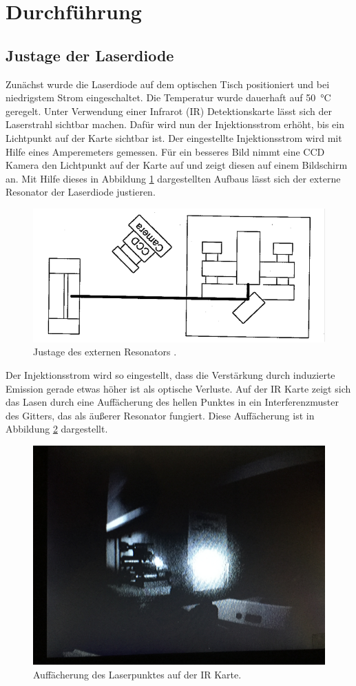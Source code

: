 \newpage
\section{Durchführung}
\label{sec:Durchführung}

\subsection{Justage der Laserdiode}
\label{sec:Justage}

Zunächst wurde die Laserdiode auf dem optischen Tisch positioniert und
bei niedrigstem Strom eingeschaltet. Die Temperatur wurde dauerhaft auf \SI{50}{\celsius} geregelt.
Unter Verwendung einer Infrarot (IR) Detektionskarte lässt sich der Laserstrahl sichtbar machen.
Dafür wird nun der Injektionsstrom erhöht, bis ein Lichtpunkt auf der Karte sichtbar ist.
Der eingestellte Injektionsstrom wird mit Hilfe eines Amperemeters gemessen.
Für ein besseres Bild nimmt eine CCD Kamera den Lichtpunkt auf der Karte auf und
zeigt diesen auf einem Bildschirm an.
Mit Hilfe dieses in Abbildung \ref{fig:ExternalCavityAlignment} dargestellten Aufbaus
lässt sich der externe Resonator der Laserdiode justieren.

\begin{figure}
	\centering
	\includegraphics[width=.6\textwidth, angle=1, origin=c]{images/ExternalCavityAlignment.pdf}
	\caption{Justage des externen Resonators \cite{anleitung}.}
	\label{fig:ExternalCavityAlignment}
\end{figure}

Der Injektionsstrom wird so eingestellt, dass die Verstärkung durch induzierte
Emission gerade etwas höher ist als optische Verluste.
Auf der IR Karte zeigt sich das Lasen durch eine Auffächerung des hellen Punktes in ein
Interferenzmuster des Gitters, das als äußerer Resonator fungiert.
Diese Auffächerung ist in Abbildung \ref{fig:laser-pattern} dargestellt.

\begin{figure}
	\centering
	\includegraphics[width=.5\textwidth]{images/laser-pattern.JPG}
	\caption{Auffächerung des Laserpunktes auf der IR Karte.}
	\label{fig:laser-pattern}
\end{figure}

